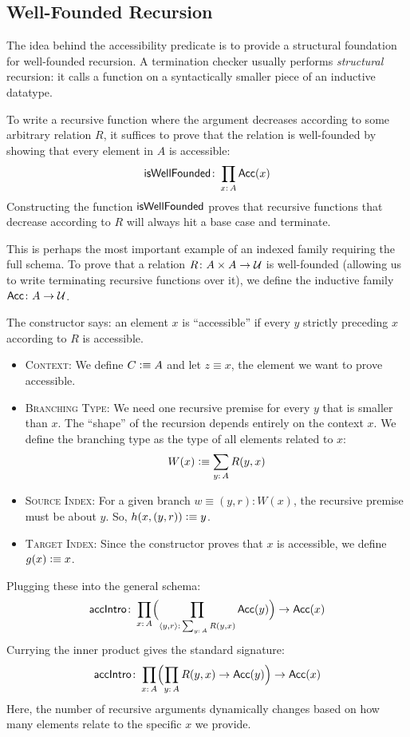 \subsection*{Well-Founded Recursion}

The idea behind the accessibility predicate is to provide a structural foundation for well-founded recursion. A termination checker usually performs \textsl{structural} recursion: it calls a function on a syntactically smaller piece of an inductive datatype.

To write a recursive function where the argument decreases according to some arbitrary relation $R$, it suffices to prove that the relation is well-founded by showing that every element in $A$ is accessible:
\[
   \fun{isWellFounded}\colon\prod_{x\colon A}\fun{Acc}(x)
\]
Constructing the function $\mathsf{isWellFounded}$ proves that recursive functions that decrease according to $R$ will always hit a base case and terminate.

\bigskip

This is perhaps the most important example of an indexed family requiring the full schema. To prove that a relation $R \colon A \times A \to \univ$ is well-founded (allowing us to write terminating recursive functions over it), we define the inductive family $\fun{Acc} \colon A \to \univ$.

The constructor says: an element $x$ is ``accessible'' if every $y$ strictly preceding $x$ according to $R$ is accessible.
\begin{itemize}
    \item \textsc{Context:} We define $C \mathrel{\vcentcolon}\equiv A$ and let $z\equiv x$, the element we want to prove accessible.
    
    \item \textsc{Branching Type:} We need one recursive premise for every $y$ that is smaller than $x$. The ``shape'' of the recursion depends entirely on the context $x$. We define the branching type as the type of all elements related to $x$:
    \[
        W(x)\defeq\sum_{y\colon A} R(y, x)
    \]
    
    \item \textsc{Source Index:} For a given branch $w \equiv (y, r) \colon W(x)$, the recursive premise must be about $y$. So,  $h(x,(y,r))\mathrel{\vcentcolon}\equiv y$.
    
    \item \textsc{Target Index:} Since the constructor proves that $x$ is accessible, we define $g(x)\mathrel{\vcentcolon}\equiv x$.
\end{itemize}
Plugging these into the general schema:
\[
    \fun{accIntro}\colon
        \prod_{x\colon A}
            \Bigl(
                \prod_{
                    \dep{y,r}\colon
                        \sum_{y\colon A} R(y,x)
                }
                \fun{Acc}(y)
            \Bigr)
            \to\fun{Acc}(x)
\]
Currying the inner product gives the standard signature:
\[
    \fun{accIntro}\colon\prod_{x\colon A}
        \Bigl(
            \prod_{y\colon A}R(y,x)\to\fun{Acc}(y) 
        \Bigr)
        \to\fun{Acc}(x)
\]
Here, the number of recursive arguments dynamically changes based on how many elements relate to the specific $x$ we provide.

